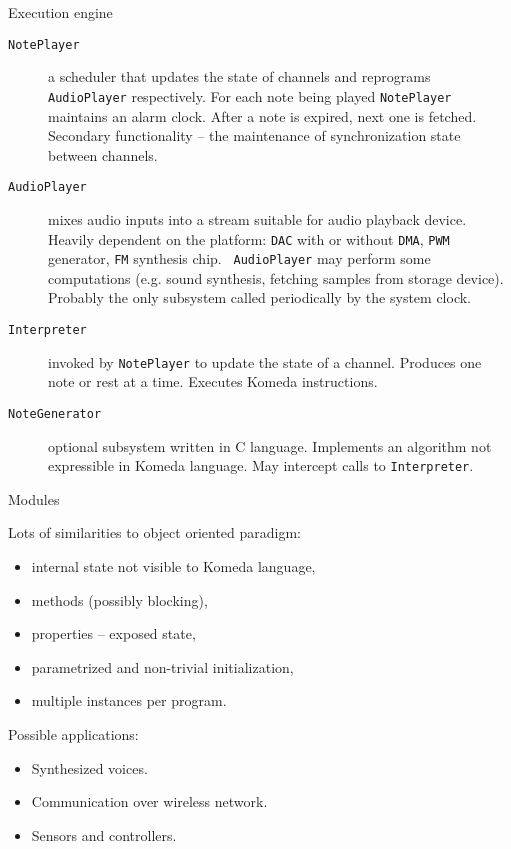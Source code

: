 \documentclass[10pt]{beamer}
\begin{document}
\begin{frame}{Execution engine}
  \begin{description}
    \item[{\tt NotePlayer}] a scheduler that updates the state of channels and
      reprograms {\tt AudioPlayer} respectively.  For each note being played
      {\tt NotePlayer} maintains an alarm clock.  After a note is expired, next
      one is fetched. Secondary functionality -- the maintenance of
      synchronization state between channels.

    \item[{\tt AudioPlayer}] mixes audio inputs into a stream suitable for
      audio playback device.  Heavily dependent on the platform: {\tt DAC} with
      or without {\tt DMA}, {\tt PWM} generator, {\tt FM} synthesis chip.  {\tt
        AudioPlayer} may perform some computations (e.g. sound synthesis,
      fetching samples from storage device).  Probably the only subsystem
      called periodically by the system clock.

    \item[{\tt Interpreter}] invoked by {\tt NotePlayer} to update the state of
      a channel.  Produces one note or rest at a time.  Executes Komeda
      instructions.

    \item[{\tt NoteGenerator}] optional subsystem written in C language.  Implements
      an algorithm not expressible in Komeda language.  May intercept calls to
      {\tt Interpreter}.
  \end{description}
\end{frame}

\begin{frame}{Modules}
  \begin{block}{Lots of similarities to object oriented paradigm:}
    \begin{itemize}
      \item internal state not visible to Komeda language,
      \item methods (possibly blocking),
      \item properties -- exposed state,
      \item parametrized and non-trivial initialization,
      \item multiple instances per program.
    \end{itemize}
  \end{block}

  \begin{block}{Possible applications:}
    \begin{itemize}
      \item Synthesized voices.
      \item Communication over wireless network.
      \item Sensors and controllers.
    \end{itemize}
  \end{block}
\end{frame}
\end{document}
